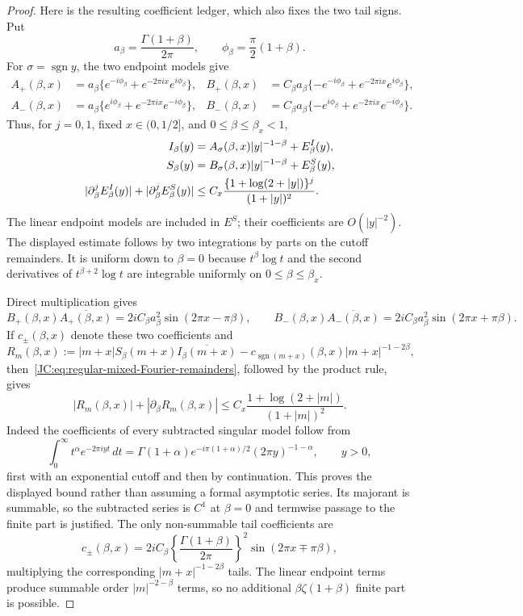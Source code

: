 \documentclass[11pt]{amsart}
\numberwithin{equation}{section}
\theoremstyle{definition}
\theoremstyle{remark}
\begin{document}
\begin{proof}
Here is the resulting coefficient ledger, which also fixes the two tail
signs.  Put
\[
 a_\beta=\frac{\Gamma(1+\beta)}{2\pi},\qquad
 \phi_\beta=\frac\pi2(1+\beta).
\]
For $\sigma=\operatorname{sgn}y$, the two endpoint models give
\begin{align*}
 A_+(\beta,x)&=a_\beta
  \{e^{-i\phi_\beta}+e^{-2\pi ix}e^{i\phi_\beta}\},&
 B_+(\beta,x)&=C_\beta a_\beta
  \{-e^{-i\phi_\beta}+e^{-2\pi ix}e^{i\phi_\beta}\},\\
 A_-(\beta,x)&=a_\beta
  \{e^{i\phi_\beta}+e^{-2\pi ix}e^{-i\phi_\beta}\},&
 B_-(\beta,x)&=C_\beta a_\beta
  \{-e^{i\phi_\beta}+e^{-2\pi ix}e^{-i\phi_\beta}\}.
\end{align*}
Thus, for $j=0,1$, fixed $x\in(0,1/2]$, and
$0\le\beta\le\beta_x<1$,
\begin{align}
 I_\beta(y)&=A_\sigma(\beta,x)|y|^{-1-\beta}
             +E^I_\beta(y),\notag\\
 S_\beta(y)&=B_\sigma(\beta,x)|y|^{-1-\beta}
             +E^S_\beta(y),\notag\\
 |\partial_\beta^jE^I_\beta(y)|
 +|\partial_\beta^jE^S_\beta(y)|
 &\le C_x\frac{\{1+\log(2+|y|)\}^{j}}{(1+|y|)^2}.
 \label{JC:eq:regular-mixed-Fourier-remainders}
\end{align}
The linear endpoint models are included in $E^S$; their coefficients are
$O(|y|^{-2})$.  The displayed estimate follows by two integrations by
parts on the cutoff remainders.  It is uniform down to $\beta=0$ because
$t^\beta\log t$ and the second derivatives of
$t^{\beta+2}\log t$ are integrable uniformly on
$0\le\beta\le\beta_x$.

Direct multiplication gives
\[
 B_+(\beta,x)\overline{A_+(\beta,x)}
 =2iC_\beta a_\beta^2\sin(2\pi x-\pi\beta),
 \qquad
 B_-(\beta,x)\overline{A_-(\beta,x)}
 =2iC_\beta a_\beta^2\sin(2\pi x+\pi\beta).
\]
If $c_\pm(\beta,x)$ denote these two coefficients and
\[
 R_m(\beta,x):=|m+x|S_\beta(m+x)\overline{I_\beta(m+x)}
 -c_{\operatorname{sgn}(m+x)}(\beta,x)|m+x|^{-1-2\beta},
\]
then~\eqref{JC:eq:regular-mixed-Fourier-remainders}, followed by the product
rule, gives
\begin{equation}\label{JC:eq:regular-mixed-endpoint-remainder}
 |R_m(\beta,x)|+|\partial_\beta R_m(\beta,x)|
 \le C_x\frac{1+\log(2+|m|)}{(1+|m|)^2}.
\end{equation}
Indeed the coefficients of every subtracted singular model follow from
\[
 \int_0^\infty t^\alpha e^{-2\pi iyt}\,dt
 =\Gamma(1+\alpha)e^{-i\pi(1+\alpha)/2}
  (2\pi y)^{-1-\alpha},\qquad y>0,
\]
first with an exponential cutoff and then by continuation.  This proves
the displayed bound rather than assuming a formal asymptotic series.
Its majorant is summable, so the subtracted series is $C^1$ at
$\beta=0$ and termwise passage to the finite part is justified.  The
only non-summable tail coefficients are
\[
 c_\pm(\beta,x)=2iC_\beta
 \left\{\frac{\Gamma(1+\beta)}{2\pi}\right\}^{\!2}
 \sin(2\pi x\mp\pi\beta),
\]
multiplying the corresponding $|m+x|^{-1-2\beta}$ tails.  The linear
endpoint terms produce summable order $|m|^{-2-\beta}$ terms, so no
additional $\beta\zeta(1+\beta)$ finite part is possible.


\end{proof}
\end{document}
